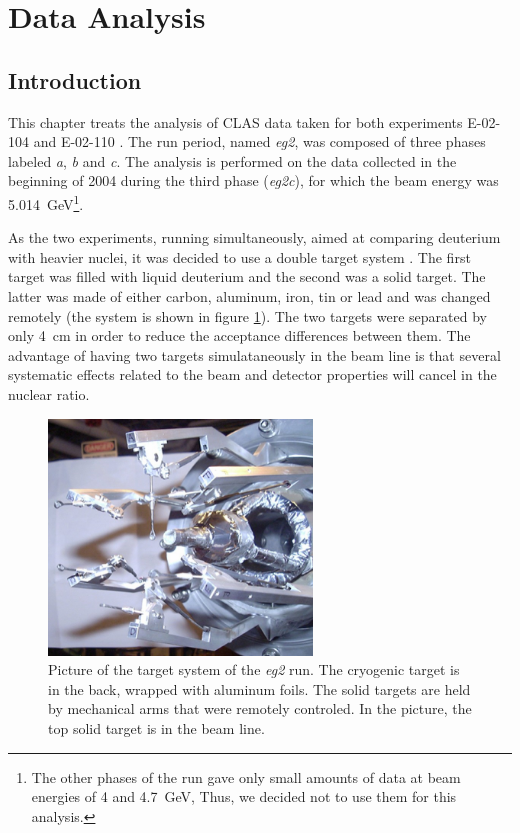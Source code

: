 \section{Data Analysis}
\label{chap:analysis}

\subsection{Introduction}

This chapter treats the analysis of CLAS data taken for both 
experiments E-02-104 \cite{Brooks:2002aa} and E-02-110 \cite{Hafidi:2002aa}.
The run period, named {\it eg2}, was composed of three phases 
labeled {\it a}, {\it b} and {\it c}. The analysis is performed on the data 
collected in the beginning of 2004 during the third phase ({\it eg2c}), for 
which the beam energy was 5.014~GeV\footnote{The other phases of the run gave only small 
amounts of data at beam energies of 4 and 4.7~GeV, Thus, we decided not to use them 
for this analysis.}.

As the two experiments, running simultaneously, aimed at comparing deuterium 
with heavier nuclei, it was decided to use a double target system 
\cite{Hakobyan:2008zz}. The first target was filled with liquid deuterium and 
the second was a solid target. The latter was made of either carbon, aluminum, 
iron, tin or lead and was changed remotely (the system is shown in figure 
\ref{fig:phototarget}). The two targets were separated by only 4~cm in order to reduce
the acceptance differences between them. The 
advantage of having two targets simulataneously in the beam line
is that several systematic effects related to the beam 
and detector properties will cancel in the nuclear ratio.

\begin{figure}[htbp]
\centering
\includegraphics[width=7cm] {chap5-fig/PhTar.jpg} 
\caption {Picture of the target system of the {\it eg2} run. The cryogenic target is 
in the back, wrapped with aluminum foils. The solid targets are held by mechanical arms
that were remotely controled. In the picture, the top solid target is in the beam line.}
\label{fig:phototarget}
\end{figure}


